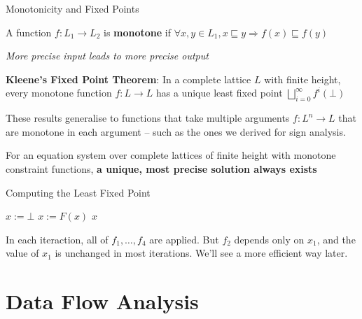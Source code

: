 \documentclass[aspectratio=169,xcolor=dvipsnames]{beamer}
\begin{document}

\begin{frame}{Monotonicity and Fixed Points}
	\begin{definition}
		A function $f: L_1 \rightarrow L_2$ is {\bf monotone} if $\forall x, y \in L_1, x \sqsubseteq y \Rightarrow$$ f(x)
		\sqsubseteq f(y)$
	\end{definition}

	{\it More precise input leads to more precise output}

	\begin{theorem}
		{\bf Kleene's Fixed Point Theorem}: In a complete lattice $L$ with finite height,
		every monotone function $f: L \rightarrow L$ has a unique least fixed point
		$\bigsqcup_{i=0}^{\infty} f^i(\bot)$
	\end{theorem}

	These results generalise to functions that take multiple arguments $f: L^n
		\rightarrow L$ that are monotone in each argument -- such as the ones we
	derived for sign analysis.

	\begin{corollary}
		For an equation system over complete lattices of finite height with monotone constraint functions,
		{\bf a unique, most precise solution always exists}
	\end{corollary}
\end{frame}


\begin{frame}[fragile]{Computing the Least Fixed Point}
	\begin{algorithm}[H]
		\begin{algorithmic}[1]
			\State $x := \bot$
			\State $x := F(x)$
			\EndWhile
			\State \Return $x$
			\EndProcedure
		\end{algorithmic}
		\caption{Naive Fixed Point Algorithm}
	\end{algorithm}

	In each iteraction, all of $f_1, \ldots, f_4$ are applied. But $f_2$ depends
	only on $x_1$, and the value of $x_1$ is unchanged in most iterations. We'll
	see a more efficient way later.
\end{frame}

\section{Data Flow Analysis}
\end{document}
